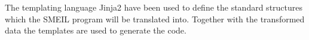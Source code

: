 The templating language Jinja2 have been used to define the standard \cspm{} structures which the SMEIL program will be translated into. Together with the transformed data the templates are used to generate the \cspm{} code.



%


